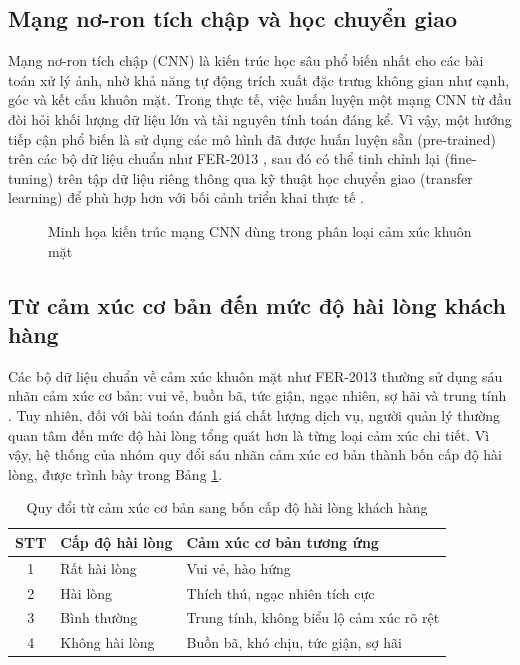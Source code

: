 \documentclass{iaesarticle}
\begin{document}
\subsection{Mạng nơ-ron tích chập và học chuyển giao}
Mạng nơ-ron tích chập (CNN) là kiến trúc học sâu phổ biến nhất cho các bài toán xử lý ảnh, nhờ khả năng tự động trích xuất đặc trưng không gian như cạnh, góc và kết cấu khuôn mặt. Trong thực tế, việc huấn luyện một mạng CNN từ đầu đòi hỏi khối lượng dữ liệu lớn và tài nguyên tính toán đáng kể. Vì vậy, một hướng tiếp cận phổ biến là sử dụng các mô hình đã được huấn luyện sẵn (pre-trained) trên các bộ dữ liệu chuẩn như FER-2013 \citep{goodfellow2013}, sau đó có thể tinh chỉnh lại (fine-tuning) trên tập dữ liệu riêng thông qua kỹ thuật học chuyển giao (transfer learning) để phù hợp hơn với bối cảnh triển khai thực tế \citep{howard2017}.

\begin{figure}[H]
\centering
{}
\vspace{.7em}
\caption{Minh họa kiến trúc mạng CNN dùng trong phân loại cảm xúc khuôn mặt}
\end{figure}

\subsection{Từ cảm xúc cơ bản đến mức độ hài lòng khách hàng}
Các bộ dữ liệu chuẩn về cảm xúc khuôn mặt như FER-2013 thường sử dụng sáu nhãn cảm xúc cơ bản: vui vẻ, buồn bã, tức giận, ngạc nhiên, sợ hãi và trung tính \citep{ekman1971}. Tuy nhiên, đối với bài toán đánh giá chất lượng dịch vụ, người quản lý thường quan tâm đến mức độ hài lòng tổng quát hơn là từng loại cảm xúc chi tiết. Vì vậy, hệ thống của nhóm quy đổi sáu nhãn cảm xúc cơ bản thành bốn cấp độ hài lòng, được trình bày trong Bảng \ref{tab:mapping}.

\begin{table}[H]
	\centering
	\fontsize{8pt}{10pt}\selectfont
	\caption{Quy đổi từ cảm xúc cơ bản sang bốn cấp độ hài lòng khách hàng}
	\label{tab:mapping}
	\begin{tabular}{clp{6.5cm}}
		\hline
		STT & Cấp độ hài lòng & Cảm xúc cơ bản tương ứng \\
		\hline
		1 & Rất hài lòng & Vui vẻ, hào hứng \\
		2 & Hài lòng & Thích thú, ngạc nhiên tích cực \\
		3 & Bình thường & Trung tính, không biểu lộ cảm xúc rõ rệt \\
		4 & Không hài lòng & Buồn bã, khó chịu, tức giận, sợ hãi \\
		\hline
	\end{tabular}
\end{table}
\end{document}
